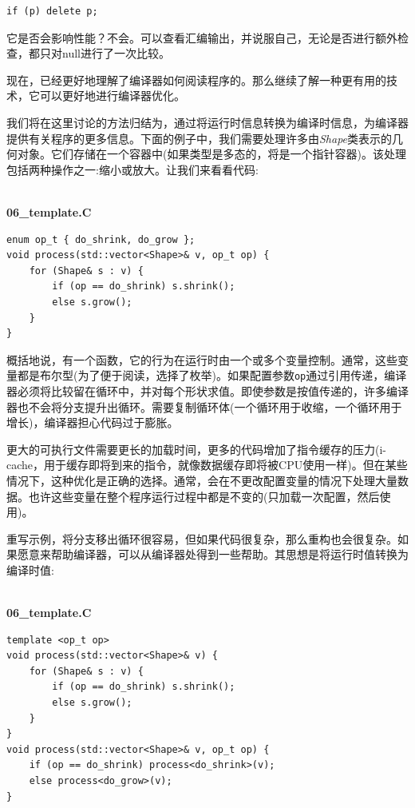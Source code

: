 \begin{lstlisting}[style=styleCXX]
if (p) delete p; 
\end{lstlisting}

它是否会影响性能？不会。可以查看汇编输出，并说服自己，无论是否进行额外检查，都只对null进行了一次比较。 

现在，已经更好地理解了编译器如何阅读程序的。那么继续了解一种更有用的技术，它可以更好地进行编译器优化。


我们将在这里讨论的方法归结为，通过将运行时信息转换为编译时信息，为编译器提供有关程序的更多信息。下面的例子中，我们需要处理许多由\textit{Shape}类表示的几何对象。它们存储在一个容器中(如果类型是多态的，将是一个指针容器)。该处理包括两种操作之一:缩小或放大。让我们来看看代码:

\hspace*{\fill} \\ %
\noindent
\textbf{06\_template.C}
\begin{lstlisting}[style=styleCXX]
enum op_t { do_shrink, do_grow };
void process(std::vector<Shape>& v, op_t op) {
	for (Shape& s : v) {
		if (op == do_shrink) s.shrink();
		else s.grow();
	}
}
\end{lstlisting}

概括地说，有一个函数，它的行为在运行时由一个或多个变量控制。通常，这些变量都是布尔型(为了便于阅读，选择了枚举)。如果配置参数\texttt{op}通过引用传递，编译器必须将比较留在循环中，并对每个形状求值。即使参数是按值传递的，许多编译器也不会将分支提升出循环。需要复制循环体(一个循环用于收缩，一个循环用于增长)，编译器担心代码过于膨胀。 

更大的可执行文件需要更长的加载时间，更多的代码增加了指令缓存的压力(i-cache，用于缓存即将到来的指令，就像数据缓存即将被CPU使用一样)。但在某些情况下，这种优化是正确的选择。通常，会在不更改配置变量的情况下处理大量数据。也许这些变量在整个程序运行过程中都是不变的(只加载一次配置，然后使用)。 

重写示例，将分支移出循环很容易，但如果代码很复杂，那么重构也会很复杂。如果愿意来帮助编译器，可以从编译器处得到一些帮助。其思想是将运行时值转换为编译时值:

\hspace*{\fill} \\ %
\noindent
\textbf{06\_template.C}
\begin{lstlisting}[style=styleCXX]
template <op_t op>
void process(std::vector<Shape>& v) {
	for (Shape& s : v) {
		if (op == do_shrink) s.shrink();
		else s.grow();
	}
}
void process(std::vector<Shape>& v, op_t op) {
	if (op == do_shrink) process<do_shrink>(v);
	else process<do_grow>(v);
}
\end{lstlisting}

